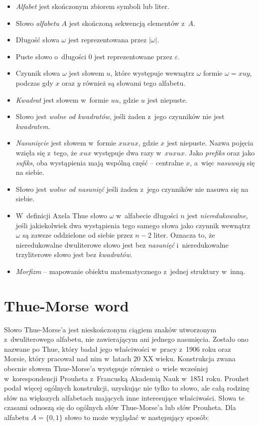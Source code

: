 \documentclass[document]{xmgr}
\begin{document}
\begin{itemize}
\item \emph{Alfabet} jest skończonym zbiorem symboli lub liter.
\item Słowo \emph{alfabetu} $A$ jest skończoną sekwencją elementów z~$A$. 
\item Długość słowa $\omega$ jest reprezentowana przez $|\omega|$.
\item Puste słowo o~długości $0$ jest reprezentowane przez $\varepsilon$.
\item Czynnik słowa $\omega$ jest słowem $u$, które występuje wewnątrz $\omega$ formie $\omega = xuy$, podczas gdy $x$ oraz $y$ również są słowami tego alfabetu.
\item \emph{Kwadrat} jest słowem w~formie $uu$, gdzie $u$ jest niepuste.
\item Słowo jest \emph{wolne od kwadratów}, jeśli żaden z~jego czynników nie jest \emph{kwadratem}.
\item \emph{Nasunięcie} jest słowem w~formie $xuxux$, gdzie $x$ jest niepuste. Nazwa pojęcia wzięła się z~tego, że $xux$ występuje dwa razy w~$xuxux$. Jako \emph{prefiks} oraz jako \emph{sufiks}, oba wystąpienia mają wspólną część -- centralne $x$, a~więc \emph{nasuwają} się na siebie.
\item Słowo jest \emph{wolne od nasunięć} jeśli żaden z~jego czynników nie nasuwa się na siebie.
\item W~definicji Axela Thue słowo $\omega$ w~alfabecie długości $n$ jest \emph{nieredukowalne}, jeśli jakiekolwiek dwa wystąpienia tego samego słowa jako czynnik wewnątrz $\omega$ są zawsze oddzielone od siebie przez $n-2$ liter. Oznacza to, że nieredukowalne dwuliterowe słowo jest bez \emph{nasunięć} i~nieredukowalne trzyliterowe słowo jest bez \emph{kwadratów}.
\item \emph{Morfizm} -- mapowanie obiektu matematycznego z~jednej struktury w~inną.
\end{itemize}



\section{Thue-Morse word}
Słowo Thue-Morse'a jest nieskończonym ciągiem znaków utworzonym z~dwuliterowego alfabetu,  nie zawierającym ani jednego nasunięcia. Zostało ono nazwane po Thue, który badał jego właściwości w~pracy z~1906 roku \cite{nagell1977selected} oraz Morsie, który pracował nad nim w~latach 20 XX wieku. Konstrukcja zwana obecnie słowem Thue-Morse'a występuje również o~wiele wcześniej w~korespondencji Prouheta \cite{prouhet} z~Francuską Akademią Nauk w~1851 roku. Prouhet podał więcej ogólnych konstrukcji, uzyskując nie tylko to słowo, ale całą rodzinę słów na większych alfabetach mających inne interesujące właściwości. Słowa te czasami odnoszą się do ogólnych słów Thue-Morse'a lub słów Prouheta. Dla alfabetu $A = \{0, 1\}$ słowo to może wyglądać w następujący sposób:
\end{document}
